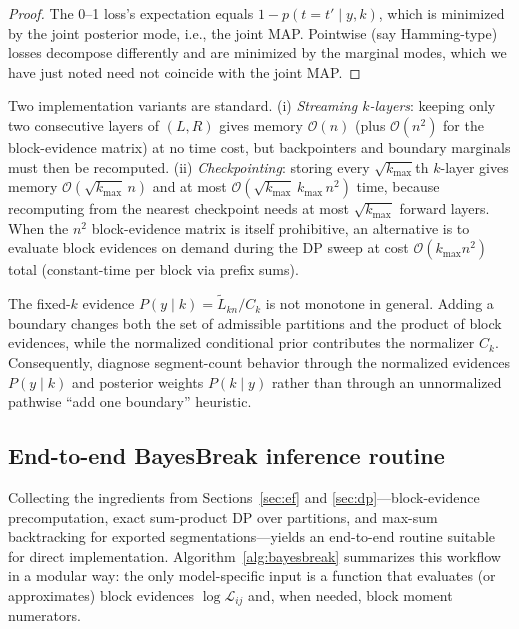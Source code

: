 \begin{proof}
The 0--1 loss's expectation equals $1-p(t=t'\mid y,k)$, which is minimized by the joint posterior
mode, i.e., the joint MAP. Pointwise (say Hamming-type) losses decompose differently and are
minimized by the marginal modes, which we have just noted need not coincide with the joint MAP.
\end{proof}

\begin{remark}
\label{rem:mem-time}
Two implementation variants are standard. (i) \emph{Streaming $k$-layers}: keeping only two
consecutive layers of $(L,R)$ gives memory $\mathcal{O}(n)$ (plus $\mathcal{O}(n^2)$ for the
block-evidence matrix) at no time cost, but backpointers and boundary marginals must then be
recomputed. (ii) \emph{Checkpointing}: storing every $\sqrt{k_{\max}}$th $k$-layer gives memory
$\mathcal{O}(\sqrt{k_{\max}}\,n)$ and at most $\mathcal{O}(\sqrt{k_{\max}}\,k_{\max}\,n^2)$ time,
because recomputing from the nearest checkpoint needs at most $\sqrt{k_{\max}}$ forward layers.
When the $n^2$ block-evidence matrix is itself prohibitive, an alternative is to evaluate block
evidences on demand during the DP sweep at cost $\mathcal{O}(k_{\max}n^2)$ total (constant-time
per block via prefix sums).
\end{remark}

\begin{remark}
\label{prop:mono-k}
The fixed-$k$ evidence $P(y\mid k)=\widetilde L_{kn}/C_k$ is not monotone in general. Adding a boundary changes both the set of admissible partitions and
the product of block evidences, while the normalized conditional prior contributes the normalizer
$C_k$. Consequently, diagnose segment-count behavior through the normalized evidences
$P(y\mid k)$ and posterior weights $P(k\mid y)$ rather than through an unnormalized pathwise
``add one boundary'' heuristic.
\end{remark}

\subsection{End-to-end BayesBreak inference routine}\label{sec:dp-alg}
Collecting the ingredients from Sections~\ref{sec:ef} and \ref{sec:dp}---block-evidence precomputation,
exact sum-product DP over partitions, and max-sum backtracking for exported segmentations---yields an
end-to-end routine suitable for direct implementation. Algorithm~\ref{alg:bayesbreak} summarizes
this workflow in a modular way: the only model-specific input is a function that evaluates (or
approximates) block evidences $\log \mathcal{L}_{ij}$ and, when needed, block moment numerators.

